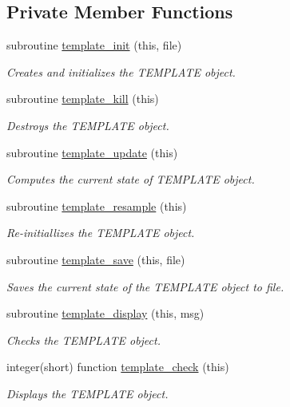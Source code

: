 \subsection*{Private Member Functions}
\begin{DoxyCompactItemize}
\item 
subroutine \hyperlink{classtemplate__class_afada03bed94ed0e30fc64e11fdc5d129}{template\-\_\-init} (this, file)
\begin{DoxyCompactList}\small\item\em Creates and initializes the T\-E\-M\-P\-L\-A\-T\-E object. \end{DoxyCompactList}\item 
subroutine \hyperlink{classtemplate__class_a366839a54d53b1b42596fcb6979c49e3}{template\-\_\-kill} (this)
\begin{DoxyCompactList}\small\item\em Destroys the T\-E\-M\-P\-L\-A\-T\-E object. \end{DoxyCompactList}\item 
subroutine \hyperlink{classtemplate__class_ab9e51260f15fea473f62d16c07329252}{template\-\_\-update} (this)
\begin{DoxyCompactList}\small\item\em Computes the current state of T\-E\-M\-P\-L\-A\-T\-E object. \end{DoxyCompactList}\item 
subroutine \hyperlink{classtemplate__class_ad296ef0f288e19f326fd85ec615223cf}{template\-\_\-resample} (this)
\begin{DoxyCompactList}\small\item\em Re-\/initiallizes the T\-E\-M\-P\-L\-A\-T\-E object. \end{DoxyCompactList}\item 
subroutine \hyperlink{classtemplate__class_a35aadd43e518eec1e9fab596d018441c}{template\-\_\-save} (this, file)
\begin{DoxyCompactList}\small\item\em Saves the current state of the T\-E\-M\-P\-L\-A\-T\-E object to file. \end{DoxyCompactList}\item 
subroutine \hyperlink{classtemplate__class_abce4d2dbf856d00e563f5bb628c446cd}{template\-\_\-display} (this, msg)
\begin{DoxyCompactList}\small\item\em Checks the T\-E\-M\-P\-L\-A\-T\-E object. \end{DoxyCompactList}\item 
integer(short) function \hyperlink{classtemplate__class_a61fa7b21db4be16f8d32b67df5b9463c}{template\-\_\-check} (this)
\begin{DoxyCompactList}\small\item\em Displays the T\-E\-M\-P\-L\-A\-T\-E object. \end{DoxyCompactList}\end{DoxyCompactItemize}


